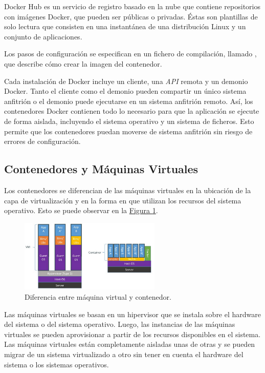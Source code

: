 Docker Hub\cite{dockerhub} es un servicio de registro basado en la nube que contiene repositorios con imágenes Docker, que pueden ser públicas o privadas. Éstas son plantillas de solo lectura que consisten en una instantánea de una distribución Linux y un conjunto de aplicaciones.

Los pasos de configuración se especifican en un fichero de compilación, llamado , que describe cómo crear la imagen del contenedor.



Cada instalación de Docker incluye un cliente, una \textit{API} remota y un demonio Docker. Tanto el cliente como el demonio pueden compartir un único sistema anfitrión o el demonio puede ejecutarse en un sistema anfitrión remoto. Así, los contenedores Docker contienen todo lo necesario para que la aplicación se ejecute de forma aislada, incluyendo el sistema operativo y un sistema de ficheros. Esto permite que los contenedores puedan moverse de sistema anfitrión sin riesgo de errores de configuración.

\subsection{Contenedores y Máquinas Virtuales}

Los contenedores se diferencian de las máquinas virtuales en la ubicación de la capa de virtualización y en la forma en que utilizan los recursos del sistema operativo. Esto se puede observar en la \hyperref[fig:containervsmv]{Figura \ref{fig:containervsmv}}.

\begin{figure}[H]
\centering
\includegraphics[width=0.6\textwidth]{images/figures/containervsmv.png}
\caption{Diferencia entre máquina virtual y contenedor.\footnotemark \label{fig:containervsmv}}
\end{figure}

Las máquinas virtuales se basan en un hipervisor que se instala sobre el hardware del sistema o del sistema operativo. Luego, las instancias de las máquinas virtuales se pueden aprovisionar a partir de los recursos disponibles en el sistema. Las máquinas virtuales están completamente aisladas unas de otras y se pueden migrar de un sistema virtualizado a otro sin tener en cuenta el hardware del sistema o los sistemas operativos.

